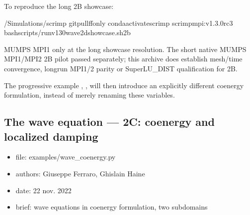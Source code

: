 \documentclass[letterpaper,10pt,english]{sphinxmanual}
\begin{document}
\sphinxAtStartPar
To reproduce the long 2B showcase:

\begin{sphinxVerbatim}[commandchars=\\\{\}]
\PYGZti{}/Simulations/scrimp
gitpull\PYGZhy{}\PYGZhy{}ff\PYGZhy{}only
condaactivatescrimp
scrimp\PYGZhy{}mpi:v1.3.0\PYGZhy{}rc3
bashscripts/run\PYGZhy{}v130\PYGZhy{}wave2d\PYGZhy{}showcase.sh2b
\end{sphinxVerbatim}

\sphinxAtStartPar
{} MUMPS MPI1 only at the long showcase
resolution. The short native MUMPS MPI1/MPI2
2B pilot passed separately; this archive
does  establish mesh/time convergence,
long\sphinxhyphen{}run MPI1/2 parity or SuperLU\_DIST
qualification for 2B.

\sphinxAtStartPar
The progressive example , {\hyperref[\detokenize{examples/wave_coenergy::doc}]{}},
will then introduce an explicitly different co\sphinxhyphen{}energy
formulation, instead of merely renaming these variables.

\sphinxstepscope


\subsection{The wave equation — 2C: co\sphinxhyphen{}energy and localized damping}
\label{\detokenize{examples/wave_coenergy:the-wave-equation-2c-co-energy-and-localized-damping}}\label{\detokenize{examples/wave_coenergy::doc}}\label{\detokenize{examples/wave_coenergy:wave-2d-coenergy}}\label{\detokenize{examples/wave_coenergy:module-examples.wave_coenergy}}\begin{itemize}
\item {} 
\sphinxAtStartPar
file:             examples/wave\_coenergy.py

\item {} 
\sphinxAtStartPar
authors:          Giuseppe Ferraro, Ghislain Haine

\item {} 
\sphinxAtStartPar
date:             22 nov. 2022

\item {} 
\sphinxAtStartPar
brief:            wave equations in co\sphinxhyphen{}energy formulation, two sub\sphinxhyphen{}domains

\end{itemize}
\end{document}
